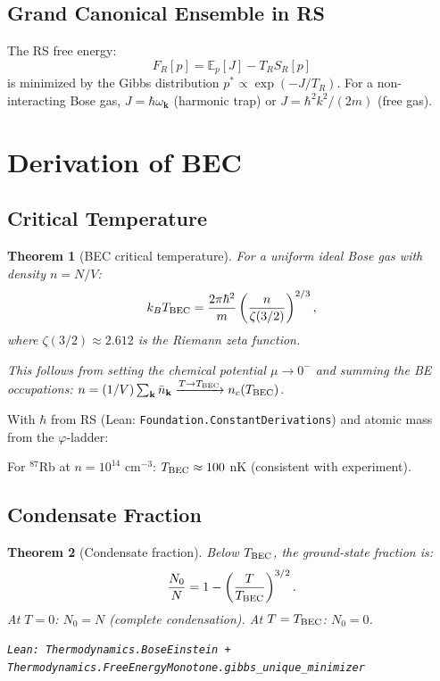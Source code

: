 \documentclass[12pt,a4paper]{article}
\newtheorem{theorem}{Theorem}[section]
\theoremstyle{definition}
\theoremstyle{remark}
\begin{document}
\subsection{Grand Canonical Ensemble in RS}

The RS free energy:
\begin{equation}
  F_R[p] = \mathbb{E}_p[J] - T_R S_R[p]
\end{equation}
is minimized by the Gibbs distribution $p^* \propto \exp(-J/T_R)$.
For a non-interacting Bose gas, $J = \hbar\omega_\mathbf{k}$ (harmonic
trap) or $J = \hbar^2k^2/(2m)$ (free gas).

\section{Derivation of BEC}

\subsection{Critical Temperature}

\begin{theorem}[BEC critical temperature]\label{thm:Tc}
For a uniform ideal Bose gas with density $n = N/V$:
\begin{equation}
  k_B T_{\rm BEC} = \frac{2\pi\hbar^2}{m}\left(\frac{n}{\zeta(3/2)}\right)^{2/3},
  \label{eq:Tc}
\end{equation}
where $\zeta(3/2) \approx 2.612$ is the Riemann zeta function.

This follows from setting the chemical potential $\mu \to 0^-$ and
summing the BE occupations:
$n = (1/V)\sum_\mathbf{k}\bar{n}_\mathbf{k} \xrightarrow{T\to T_{\rm BEC}} n_c(T_{\rm BEC})$.
\end{theorem}

With $\hbar$ from RS (Lean: \texttt{Foundation.ConstantDerivations})
and atomic mass from the $\varphi$-ladder:

For ${}^{87}$Rb at $n = 10^{14}$ cm$^{-3}$:
$T_{\rm BEC} \approx 100$ nK (consistent with experiment).

\subsection{Condensate Fraction}

\begin{theorem}[Condensate fraction]\label{thm:frac}
Below $T_{\rm BEC}$, the ground-state fraction is:
\begin{equation}
  \frac{N_0}{N} = 1 - \left(\frac{T}{T_{\rm BEC}}\right)^{3/2}.
  \label{eq:frac}
\end{equation}
At $T=0$: $N_0 = N$ (complete condensation).
At $T = T_{\rm BEC}$: $N_0 = 0$.

\texttt{Lean: Thermodynamics.BoseEinstein + Thermodynamics.FreeEnergyMonotone.gibbs\_unique\_minimizer}
\end{theorem}
\end{document}
